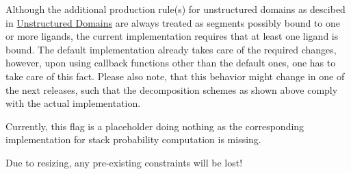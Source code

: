 
\begin{DoxyRefList}
\item[\label{bug__bug000003}%
\Hypertarget{bug__bug000003}%
Module \hyperlink{group__domains__up}{domains\+\_\+up} ]Although the additional production rule(s) for unstructured domains as descibed in \hyperlink{folding_grammar_sec_domains_up}{Unstructured Domains} are always treated as \textquotesingle{}segments possibly bound to one or more ligands\textquotesingle{}, the current implementation requires that at least one ligand is bound. The default implementation already takes care of the required changes, however, upon using callback functions other than the default ones, one has to take care of this fact. Please also note, that this behavior might change in one of the next releases, such that the decomposition schemes as shown above comply with the actual implementation. 
\item[\label{bug__bug000001}%
\Hypertarget{bug__bug000001}%
Global \hyperlink{group__part__func__window_ga0a13fc668b02f21b225e2334e4caac08}{V\+R\+N\+A\+\_\+\+P\+R\+O\+B\+S\+\_\+\+W\+I\+N\+D\+O\+W\+\_\+\+S\+T\+A\+C\+KP} ]Currently, this flag is a placeholder doing nothing as the corresponding implementation for stack probability computation is missing. 
\item[\label{bug__bug000002}%
\Hypertarget{bug__bug000002}%
Global \hyperlink{group__subopt__zuker_gababde9d210eb433854f1e71da7815fbb}{vrna\+\_\+subopt\+\_\+zuker} (vrna\+\_\+fold\+\_\+compound\+\_\+t $\ast$vc)]Due to resizing, any pre-\/existing constraints will be lost!
\end{DoxyRefList}
